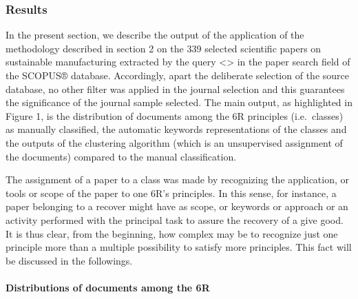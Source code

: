 \documentclass[]{book}
\let\oldparagraph\paragraph
\renewcommand{\paragraph}[1]{\oldparagraph{#1}\mbox{}}
\begin{document}
\subsubsection{Results}\label{results-1}

In the present section, we describe the output of the application of the
methodology described in section 2 on the 339 selected scientific papers
on sustainable manufacturing extracted by the query
\textless{}\textgreater{} in the paper search field of the SCOPUS®
database. Accordingly, apart the deliberate selection of the source
database, no other filter was applied in the journal selection and this
guarantees the significance of the journal sample selected. The main
output, as highlighted in Figure 1, is the distribution of documents
among the 6R principles (i.e.~classes) as manually classified, the
automatic keywords representations of the classes and the outputs of the
clustering algorithm (which is an unsupervised assignment of the
documents) compared to the manual classification.

The assignment of a paper to a class was made by recognizing the
application, or tools or scope of the paper to one 6R's principles. In
this sense, for instance, a paper belonging to a recover might have as
scope, or keywords or approach or an activity performed with the
principal task to assure the recovery of a give good. It is thus clear,
from the beginning, how complex may be to recognize just one principle
more than a multiple possibility to satisfy more principles. This fact
will be discussed in the followings.

\paragraph{Distributions of documents among the
6R}\label{distributions-of-documents-among-the-6r}
\end{document}
